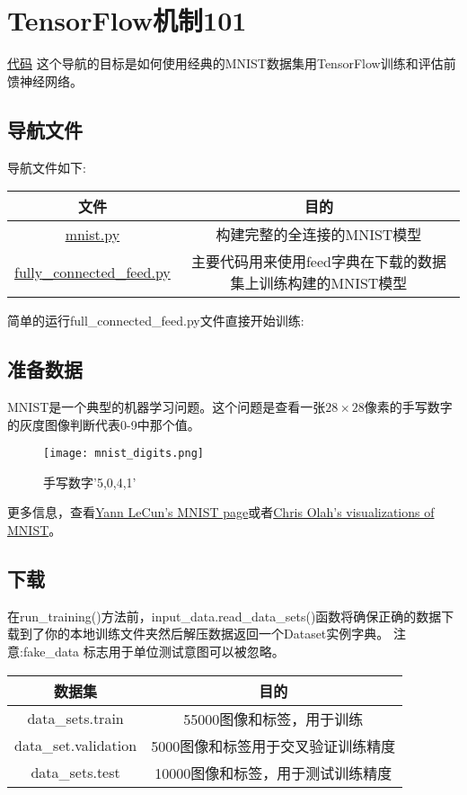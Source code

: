 \section{TensorFlow机制101}
\href{https://www.github.com/tensorflow/tensorflow/blob/r1.4/tensorflow/examples/tutorials/mnist/}{代码}
这个导航的目标是如何使用经典的MNIST数据集用TensorFlow训练和评估前馈神经网络。
\subsection{导航文件}
导航文件如下:
\begin{table}[H]
\centering
	\begin{tabular}{|c|c|}
		\hline
		文件&目的\\
		\hline
		\href{https://www.github.com/tensorflow/tensorflow/blob/r1.4/tensorflow/examples/tutorials/mnist/mnist.py}{mnist.py}&构建完整的全连接的MNIST模型\\
		\hline
		\href{https://www.github.com/tensorflow/tensorflow/blob/r1.4/tensorflow/examples/tutorials/mnist/fully_connected_feed.py}{fully\_connected\_feed.py}&主要代码用来使用feed字典在下载的数据集上训练构建的MNIST模型\\
		\hline 
	\end{tabular}
\end{table}
简单的运行full\_connected\_feed.py文件直接开始训练:\newline
{}
\subsection{准备数据}
MNIST是一个典型的机器学习问题。这个问题是查看一张$28\times 28$像素的手写数字的灰度图像判断代表0-9中那个值。
\begin{figure}[H]
\centering
\texttt{[image: mnist\_digits.png]}
\caption{手写数字'5,0,4,1'}
\end{figure}
更多信息，查看\href{http://yann.lecun.com/exdb/mnist/}{Yann LeCun's MNIST page}或者\href{http://colah.github.io/posts/2014-10-Visualizing-MNIST/}{Chris Olah's visualizations of MNIST}。
\subsection{下载}
在run\_training()方法前，input\_data.read\_data\_sets()函数将确保正确的数据下载到了你的本地训练文件夹然后解压数据返回一个Dataset实例字典。
注意:fake\_data 标志用于单位测试意图可以被忽略。
\begin{table}[H]
\centering
	\begin{tabular}{|c|c|}
	\hline 
		数据集&目的\\
		\hline
		data\_sets.train&55000图像和标签，用于训练\\
		\hline
		data\_set.validation&5000图像和标签用于交叉验证训练精度\\
		\hline
		data\_sets.test&10000图像和标签，用于测试训练精度\\
	\end{tabular}
\end{table}
